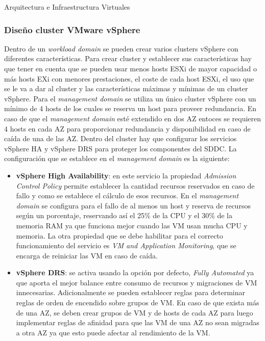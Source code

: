 \begin{subsection}{Arquitectura e Infraestructura Virtuales\cite{CFVirtInfraes}}

\subsubsection{Diseño cluster VMware vSphere}
Dentro de un \textit{workload domain} se pueden crear varios clusters vSphere con diferentes características. Para crear cluster y establecer sus características hay que tener en cuenta que se pueden usar menos hosts ESXi de mayor capacidad o más hosts EXi con menores prestaciones, el coste de cada host ESXi, el uso que se le va a dar al cluster y las características máximas y mínimas de un cluster vSphere. Para el \textit{management domain} se utiliza un único cluster vSphere con un mínimo de 4 hosts de los cuales se reserva un host para proveer redundancia. En caso de que el \textit{management domain} esté extendido en dos AZ entoces se requieren 4 hosts en cada AZ para proporcionar redundancia y disponibilidad en caso de caída de una de las AZ.
Dentro del cluster hay que configurar los servicios vSphere HA y vSphere DRS para proteger los componentes del SDDC. La configuración que se establece en el \textit{management domain} es la siguiente:
\begin{itemize}
    \item \textbf{vSphere High Availability}: en este servicio la propiedad \textit{Admission Control Policy} permite establecer la cantidad recursos reservados en caso de fallo y como se establece el cálculo de esos recursos. En el \textit{management domain} se configura para el fallo de al menos un host y reserva de recursos según un porcentaje, reservando así el 25\% de la CPU y el 30\% de la memoria RAM ya que funciona mejor cuando las VM usan mucha CPU y memoria. La otra propiedad que se debe habilitar para el correcto funcionamiento del servicio es \textit{VM and Application Monitoring}, que se encarga de reiniciar las VM en caso de caída.
    \item \textbf{vSphere DRS}: se activa usando la opción por defecto, \textit{Fully Automated} ya que aporta el mejor balance entre consumo de recursos y migraciones de VM innecesarias. Adicionalmente se pueden establecer reglas para determinar reglas de orden de encendido sobre grupos de VM. En caso de que exista más de una AZ, se deben crear grupos de VM y de hosts de cada AZ para luego implementar reglas de afinidad para que las VM de una AZ no sean migradas a otra AZ ya que esto puede afectar al rendimiento de la VM. 

\end{itemize}
\end{subsection}
